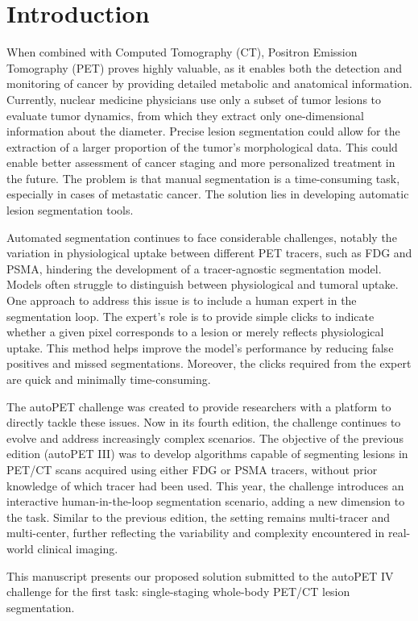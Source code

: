\documentclass[runningheads]{llncs}
\begin{document}
\section{Introduction}
When combined with Computed Tomography (CT), Positron Emission Tomography (PET) proves highly valuable, as it enables both the detection and monitoring of cancer by providing detailed metabolic and anatomical information.
Currently, nuclear medicine physicians use only a subset of tumor lesions to evaluate tumor dynamics, from which they extract only one-dimensional information about the diameter.
Precise lesion segmentation could allow for the extraction of a larger proportion of the tumor’s morphological data.
This could enable better assessment of cancer staging and more personalized treatment in the future.
The problem is that manual segmentation is a time-consuming task, especially in cases of metastatic cancer.
The solution lies in developing automatic lesion segmentation tools.

Automated segmentation continues to face considerable challenges, notably the variation in physiological uptake between different PET tracers, such as FDG and PSMA, hindering the development of a tracer-agnostic segmentation model.
Models often struggle to distinguish between physiological and tumoral uptake.
One approach to address this issue is to include a human expert in the segmentation loop.
The expert's role is to provide simple clicks to indicate whether a given pixel corresponds to a lesion or merely reflects physiological uptake.
This method helps improve the model's performance by reducing false positives and missed segmentations.
Moreover, the clicks required from the expert are quick and minimally time-consuming. 

The autoPET challenge was created to provide researchers with a platform to directly tackle these issues.
Now in its fourth edition, the challenge continues to evolve and address increasingly complex scenarios.
The objective of the previous edition (autoPET III) was to develop algorithms capable of segmenting lesions in PET/CT scans acquired using either FDG or PSMA tracers, without prior knowledge of which tracer had been used.
This year, the challenge introduces an interactive human-in-the-loop segmentation scenario, adding a new dimension to the task.
Similar to the previous edition, the setting remains multi-tracer and multi-center, further reflecting the variability and complexity encountered in real-world clinical imaging. 

This manuscript presents our proposed solution submitted to the autoPET IV challenge for the first task: single-staging whole-body PET/CT lesion segmentation.
\end{document}

